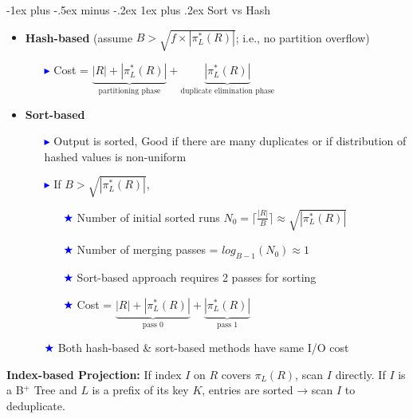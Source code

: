 \documentclass[10pt,landscape]{article}
\makeatletter
\newcommand{\subsubsubsection}{\@startsection{subsubsection}{3}{0mm}%
                                {-1ex plus -.5ex minus -.2ex}%
                                {1ex plus .2ex}%
                                {\normalfont\scriptsize\bfseries}}
\newcommand{\1}{\mathmybb{1}}
\makeatother
\begin{document}
\begin{multicols*}{3}
\subsubsubsection{Sort vs Hash}
\begin{itemize}
    \item \textbf{Hash-based} (assume $B > \sqrt{f \times |\pi_L^*(R)|}$; i.e., no partition overflow)
    \begin{itemize}
        \item[\textcolor{blue}{$\blacktriangleright$}] Cost = 
        $\underbrace{|R| + |\pi_L^*(R)|}_{\text{partitioning phase}} + \underbrace{|\pi_L^*(R)|}_{\text{duplicate elimination phase}}$
    \end{itemize}
    \item \textbf{Sort-based}
    \begin{itemize}
        \item[\textcolor{blue}{$\blacktriangleright$}] Output is sorted, Good if there are many duplicates or if distribution of hashed values is non-uniform
        \item[\textcolor{blue}{$\blacktriangleright$}] If $B > \sqrt{|\pi_L^*(R)|}$,
        \begin{itemize}
            \item[\textcolor{blue}{$\bigstar$}] Number of initial sorted runs $N_0 = \lceil \frac{|R|}{B} \rceil \approx \sqrt{|\pi_L^*(R)|}$
            \item[\textcolor{blue}{$\bigstar$}] Number of merging passes = $log_{B-1}(N_0) \approx 1$
            \item[\textcolor{blue}{$\bigstar$}] Sort-based approach requires 2 passes for sorting
            \item[\textcolor{blue}{$\bigstar$}] Cost = 
            $\underbrace{|R| + |\pi_L^*(R)|}_{\text{pass 0}} + \underbrace{|\pi_L^*(R)|}_{\text{pass 1}}$
        \end{itemize}
        \item[\textcolor{blue}{$\bigstar$}] Both hash-based \& sort-based methods have same I/O cost
    \end{itemize}
\end{itemize}
\textbf{Index-based Projection:} If index $I$ on $R$ covers $\pi_L(R)$, scan $I$ directly. If $I$ is a B$^+$ Tree and $L$ is a prefix of its key $K$, entries are sorted → scan $I$ to deduplicate.


\end{multicols*}
\end{document}

